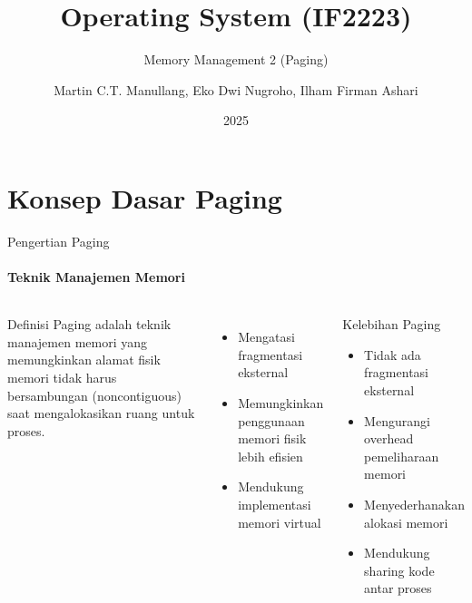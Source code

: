 \documentclass[10pt,aspectratio=169]{beamer}
\title{Operating System (IF2223)}
\subtitle{Memory Management 2 (Paging)}
\author{Martin C.T. Manullang, Eko Dwi Nugroho, Ilham Firman Ashari}
\institute[COMP]{Teknik Informatika, ITERA}
\date{2025}
\begin{document}
\maketitle

\section{Konsep Dasar Paging}

\begin{frame}{Pengertian Paging}
    \framesubtitle{Teknik Manajemen Memori}
    \begin{columns}[T]
            \begin{block}{Definisi}
                Paging adalah teknik manajemen memori yang memungkinkan alamat fisik memori tidak harus bersambungan (noncontiguous) saat mengalokasikan ruang untuk proses.
            \end{block}
            
            \begin{itemize}
                \item Mengatasi fragmentasi eksternal
                \item Memungkinkan penggunaan memori fisik lebih efisien
                \item Mendukung implementasi memori virtual
            \end{itemize}
            
            \begin{alertblock}{Kelebihan Paging}
                \begin{itemize}
                    \item Tidak ada fragmentasi eksternal
                    \item Mengurangi overhead pemeliharaan memori
                    \item Menyederhanakan alokasi memori
                    \item Mendukung sharing kode antar proses
                \end{itemize}
            \end{alertblock}
    \end{columns}
\end{frame}
\end{document}
